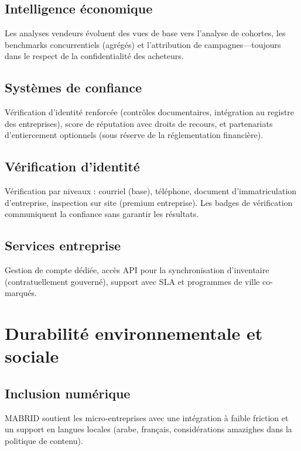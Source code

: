 \subsection{Intelligence économique}

Les analyses vendeurs évoluent des vues de base vers l'analyse de cohortes, les benchmarks concurrentiels (agrégés) et l'attribution de campagnes---toujours dans le respect de la confidentialité des acheteurs.

\subsection{Systèmes de confiance}

Vérification d'identité renforcée (contrôles documentaires, intégration au registre des entreprises), score de réputation avec droits de recours, et partenariats d'entiercement optionnels (sous réserve de la réglementation financière).

\subsection{Vérification d'identité}

Vérification par niveaux : courriel (base), téléphone, document d'immatriculation d'entreprise, inspection sur site (premium entreprise). Les badges de vérification communiquent la confiance sans garantir les résultats.

\subsection{Services entreprise}

Gestion de compte dédiée, accès API pour la synchronisation d'inventaire (contratuellement gouverné), support avec SLA et programmes de ville co-marqués.

\section{Durabilité environnementale et sociale}

\subsection{Inclusion numérique}

MABRID soutient les micro-entreprises avec une intégration à faible friction et un support en langues locales (arabe, français, considérations amazighes dans la politique de contenu).

